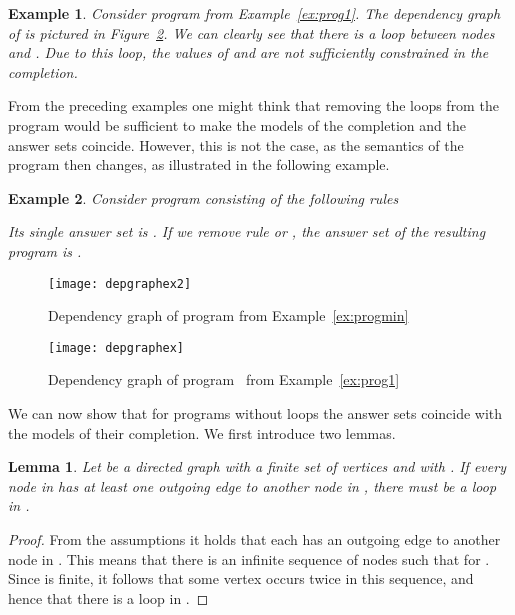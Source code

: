 \documentclass{tlp}
\newtheorem{example}{Example}
\newtheorem{lemma}{Lemma}
\begin{document}
\begin{example}
Consider program  from Example~\ref{ex:prog1}. The dependency graph of  is pictured in Figure~\ref{fig:depgraph-prog1}. We can clearly see that there is a loop between nodes  and . Due to this loop, the values of  and  are not sufficiently constrained in the completion.
\end{example}

From the preceding examples one might think that removing the loops from the program would be sufficient to make the models of the completion and the answer sets coincide. However, this is not the case, as the semantics of the program then changes, as illustrated in the following example.

\begin{example}\label{ex:progchange}
 Consider program  consisting of the following rules
 
 Its single answer set is . If we remove rule  or , the answer set of the resulting program is .
\end{example}

\begin{figure}
 \centering
 \texttt{[image: depgraphex2]}
 \caption{Dependency graph of program  from Example~\ref{ex:progmin}}
 \label{fig:depgraph-prog2}
\end{figure}

\begin{figure}
 \centering
 \texttt{[image: depgraphex]}
 \caption{Dependency graph of program~ from Example~\ref{ex:prog1}}
 \label{fig:depgraph-prog1}
\end{figure}

We can now show that for programs without loops the answer sets coincide with the models of their completion. We first introduce two lemmas.

\begin{lemma}\label{lem:noloop-modelcomp-is-ansset-1}
 Let  be a directed graph with a finite set of vertices and  with . If every node in  has at least one outgoing edge to another node in , there must be a loop in .
\end{lemma}
\begin{proof}
 From the assumptions it holds that each  has an outgoing edge to another node in . This means that there is an infinite sequence of nodes  such that  for . Since  is finite, it follows that some vertex occurs twice in this sequence, and hence that there is a loop in .
\end{proof}
\end{document}
